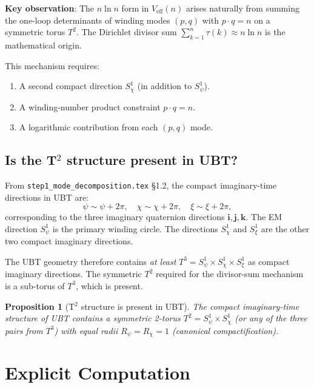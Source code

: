 \documentclass[12pt,a4paper]{article}
\newtheorem{proposition}[theorem]{Proposition}
\theoremstyle{remark}
\newcommand{\Veff}{V_{\mathrm{eff}}}
\begin{document}
\begin{insightbox}
\textbf{Key observation}: The $n\ln n$ form in $\Veff(n)$ arises naturally
from summing the one-loop determinants of winding modes $(p,q)$ with
$p\cdot q = n$ on a symmetric torus $T^2$.  The Dirichlet divisor sum
$\sum_{k=1}^n\tau(k) \approx n\ln n$ is the mathematical origin.

This mechanism requires:
\begin{enumerate}
  \item A second compact direction $S^1_\chi$ (in addition to $S^1_\psi$).
  \item A winding-number product constraint $p\cdot q = n$.
  \item A logarithmic contribution from each $(p,q)$ mode.
\end{enumerate}
\end{insightbox}

\subsection{Is the T$^2$ structure present in UBT?}

From \texttt{step1\_mode\_decomposition.tex} §1.2, the compact imaginary-time
directions in UBT are:
\begin{equation}
  \psi\sim\psi+2\pi,\quad \chi\sim\chi+2\pi,\quad \xi\sim\xi+2\pi,
  \label{eq:compact_dirs}
\end{equation}
corresponding to the three imaginary quaternion directions $\mathbf{i}, \mathbf{j},
\mathbf{k}$.  The EM direction $S^1_\psi$ is the primary winding circle.
The directions $S^1_\chi$ and $S^1_\xi$ are the other two compact imaginary
directions.

The UBT geometry therefore contains \emph{at least} $T^3 = S^1_\psi\times S^1_\chi\times S^1_\xi$
as compact imaginary directions.  The symmetric $T^2$ required for the
divisor-sum mechanism is a sub-torus of $T^3$, which is present.

\begin{proposition}[T$^2$ structure is present in UBT]
\label{prop:T2}
The compact imaginary-time structure of UBT contains a symmetric 2-torus
$T^2 = S^1_\psi\times S^1_\chi$ (or any of the three pairs from $T^3$) with
equal radii $R_\psi = R_\chi = 1$ (canonical compactification).
\end{proposition}

\section{Explicit Computation}
\label{sec:computation}
\end{document}
